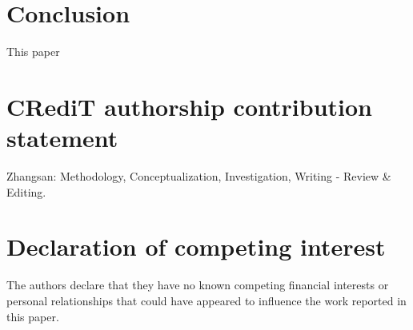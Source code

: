 \documentclass[a4paper,fleqn]{cas-dc}
\begin{document}
\begin{sloppypar}
	\begin{table}[width=\textwidth,cols=4,pos=ht]
		\caption{12345 xxxxxxxxxxxxxxxxx xxXX  X XX XXXXXXXXXXX X  XXXXXX.}
		\label{tbl2}
	\end{table}

	\section{Conclusion}
	\label{Conclusion}
	\par{
		This paper
	}

	\section*{CRediT authorship contribution statement}
	\par{Zhangsan: Methodology, Conceptualization, Investigation, Writing - Review \& Editing. }

	\section*{Declaration of competing interest}
	\par{The authors declare that they have no known competing financial interests or personal relationships that could have appeared to influence the work reported in this paper.}


\end{sloppypar}
\end{document}
